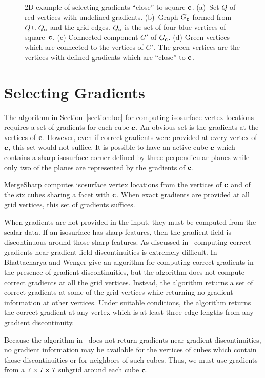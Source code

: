 \begin{figure}[t]
\caption{2D example of selecting gradients ``close'' to square $\mathbf{c}$.
(a)~Set $Q$ of red vertices with undefined gradients.
(b)~Graph $G_{\mathbf{c}}$ formed from $Q \cup Q_{\mathbf{c}}$ and the grid edges.
$Q_{\mathbf{c}}$ is the set of four blue vertices of square~$\mathbf{c}$.
(c) Connected component $G'$ of $G_{\mathbf{c}}$.
(d) Green vertices which are connected to the vertices of $G'$.
The green vertices are the vertices with defined gradients
which are ``close'' to $\mathbf{c}$.
}
\label{fig:grad_select}
\end{figure}


\section{Selecting Gradients}
\label{section:gradients}

The algorithm in Section~\ref{section:loc}
for computing isosurface vertex locations requires
a set of gradients for each cube $\mathbf{c}$.
An obvious set is the gradients at the vertices of $\mathbf{c}$.
However, even if correct gradients were provided at every vertex of $\mathbf{c}$,
this set would not suffice.
It is possible to have an active cube $\mathbf{c}$
which contains a sharp isosurface corner
defined by three perpendicular planes
while only two of the planes are represented by the gradients of $\mathbf{c}$.

MergeSharp computes isosurface vertex locations 
from the vertices of $\mathbf{c}$ and of the six cubes sharing a facet with $\mathbf{c}$.
When exact gradients are provided at all grid vertices,
this set of gradients suffices.

When gradients are not provided in the input,
they must be computed from the scalar data.
If an isosurface has sharp features,
then the gradient field is discontinuous around those sharp features.
As discussed in~\cite{bw-crgsd-15}
computing correct gradients near gradient field discontinuities
is extremely difficult.
In~\cite{bw-crgsd-15}
Bhattacharya and Wenger give an algorithm for computing correct gradients
in the presence of gradient discontinuities, but the algorithm does
not compute correct gradients at all the grid vertices.
Instead, the algorithm returns a set of correct gradients
at some of the grid vertices while returning no gradient information
at other vertices.
Under suitable conditions,
the algorithm returns the correct gradient at any vertex
which is at least three edge lengths from any gradient discontinuity.

Because the algorithm in~\cite{bw-crgsd-15}
does not return gradients near gradient discontinuities,
no gradient information may be available for the vertices 
of cubes which contain those discontinuities
or for neighbors of such cubes.
Thus, we must use gradients from a $7 \times 7 \times 7$ subgrid around each cube $\mathbf{c}$.

